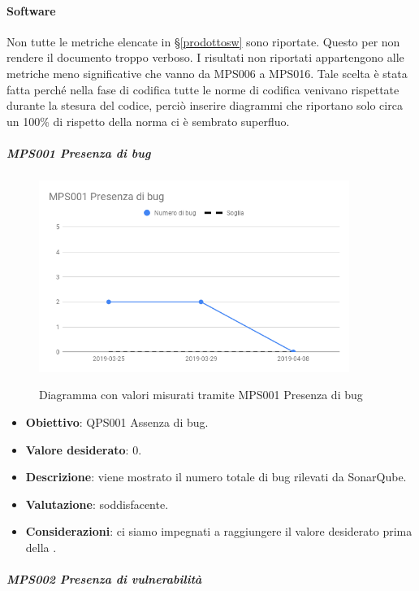 	\paragraph{Software}
    Non tutte le metriche elencate in \S\ref{prodottosw} sono riportate. Questo per non rendere il documento troppo verboso. I risultati non riportati appartengono alle metriche meno significative che vanno da MPS006 a MPS016. Tale scelta è stata fatta perché nella fase di codifica tutte le norme di codifica venivano rispettate durante la stesura del codice, perciò inserire diagrammi che riportano solo circa un 100\% di rispetto della norma ci è sembrato superfluo.
	
	\subparagraph{MPS001 Presenza di bug}
	
	\begin{figure}[H]
		\centering
		\includegraphics[width=0.9\textwidth]{img/cruscotti/RQ/MPS001.png}
		\label{immaginePresenzaBugRQ}
		\caption{Diagramma con valori misurati tramite MPS001 Presenza di bug}
	\end{figure}
	
	\begin{itemize}
		\item \textbf{Obiettivo}: QPS001 Assenza di bug.
		\item \textbf{Valore desiderato}: 0.
		\item \textbf{Descrizione}: viene mostrato il numero totale di bug rilevati da SonarQube.
		\item \textbf{Valutazione}: soddisfacente.
		\item \textbf{Considerazioni}: ci siamo impegnati a raggiungere il valore desiderato prima della \RQ.
	\end{itemize}
	
	\subparagraph{MPS002 Presenza di vulnerabilità}
	
